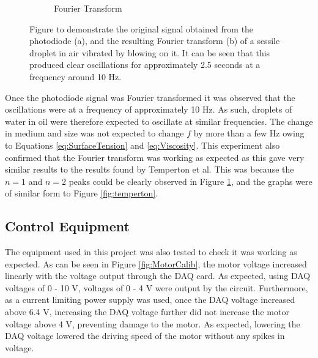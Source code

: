 \documentclass{physics_article_B}
\begin{document}
\begin{figure}[H]
\begin{subfigure}[b]{0.48\textwidth}
                    \caption{Fourier Transform}
                    \label{fig:Water:FT}
                \end{subfigure}
            \caption{Figure to demonstrate the original signal obtained from the photodiode (a), and the resulting Fourier transform (b) of a sessile droplet in air vibrated by blowing on it. It can be seen that this produced clear oscillations for approximately 2.5 seconds at a frequency around 10 Hz. }\label{fig:Water}
            \end{figure} 
            
    Once the photodiode signal was Fourier transformed it was observed that the oscillations were at a frequency of approximately 10 Hz. As such, droplets of water in oil were therefore expected to oscillate at similar frequencies. The change in medium and size was not expected to change $f$ by more than a few Hz owing to Equations \ref{eq:SurfaceTension} and \ref{eq:Viscosity}. This experiment also confirmed that the Fourier transform was working as expected as this gave very similar results to the results found by Temperton et al\cite{temperton}. This was because the $n = 1$ and $n = 2$ peaks could be clearly observed in Figure \ref{fig:Water:FT}, and the graphs were of similar form to Figure \ref{fig:temperton}.

    \subsection{Control Equipment\label{sect:results:control}}
    
        The equipment used in this project was also tested to check it was working as expected. As can be seen in Figure \ref{fig:MotorCalib}, the motor voltage increased linearly with the voltage output through the DAQ card. As expected, using DAQ voltages of 0 - 10 V, voltages of 0 - 4 V were output by the circuit. Furthermore, as a current limiting power supply was used, once the DAQ voltage increased above 6.4 V, increasing the DAQ voltage further did not increase the motor voltage above 4 V, preventing damage to the motor. As expected, lowering the DAQ voltage lowered the driving speed of the motor without any spikes in voltage.
        
\end{document}
